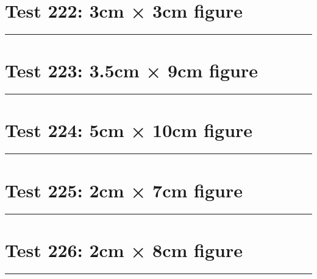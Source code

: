 \documentclass[a4paper,11pt]{article}
\begin{document}
\section*{Test 222: 3cm × 3cm figure}
\begin{swarmwrap}%
  \begin{minipage}[t]{3cm}
    \centering
    \rule{\linewidth}{3cm}
  \end{minipage}%
\end{swarmwrap}%
\swarmwrapnext
\lipsum[86]
\lipsum[87]
\lipsum[88]
\lipsum[89]
\section*{Test 223: 3.5cm × 9cm figure}
\begin{swarmwrap}%
  \begin{minipage}[t]{3cm}
    \centering
    \rule{\linewidth}{9cm}
  \end{minipage}%
\end{swarmwrap}%
\swarmwrapnext
\lipsum[104]
\lipsum[105]
\lipsum[106]
\lipsum[107]
\lipsum[108]
\section*{Test 224: 5cm × 10cm figure}
\begin{swarmwrap}%
  \begin{minipage}[t]{5cm}
    \centering
    \rule{\linewidth}{10cm}
  \end{minipage}%
\end{swarmwrap}%
\swarmwrapnext
\lipsum[118]
\lipsum[119]
\lipsum[120]
\section*{Test 225: 2cm × 7cm figure}
\begin{swarmwrap}%
  \begin{minipage}[t]{2cm}
    \centering
    \rule{\linewidth}{7cm}
  \end{minipage}%
\end{swarmwrap}%
\swarmwrapnext
\lipsum[84]
\lipsum[85]
\lipsum[86]
\lipsum[87]
\lipsum[88]
\section*{Test 226: 2cm × 8cm figure}
\begin{swarmwrap}%
  \begin{minipage}[t]{2cm}
    \centering
    \rule{\linewidth}{8cm}
  \end{minipage}%
\end{swarmwrap}%
\swarmwrapnext
\lipsum[140]
\lipsum[141]
\lipsum[142]
\end{document}
